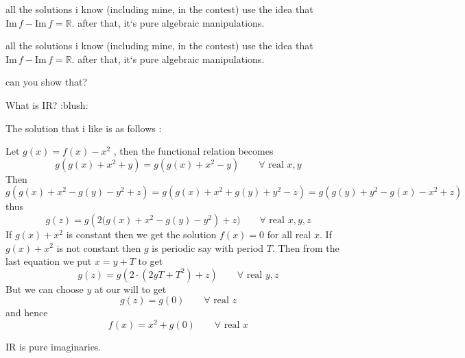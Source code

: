 \begin{mysolution}
	all the solutions i know (including mine, in the contest) use the idea that $\mbox{Im}\, f-\mbox{Im}\, f =\mathbb{R}$. after that, it`s pure algebraic manipulations.
\end{mysolution}



\begin{mysolution}
	\begin{tcolorbox}all the solutions i know (including mine, in the contest) use the idea that $\mbox{Im}\, f-\mbox{Im}\, f =\mathbb{R}$. after that, it`s pure algebraic manipulations.\end{tcolorbox}

can you show that?
\end{mysolution}



\begin{mysolution}
	What is IR?  :blush:
\end{mysolution}



\begin{mysolution}
	\begin{tcolorbox}The solution that i like is as follows :

Let $g(x)=f(x)-x^{2}$ , then the functional relation becomes \[g\left(g(x)+x^{2}+y\right)=g\left(g(x)+x^{2}-y\right)\qquad \forall \text{ real }x,y\]Then \[g\left(g(x)+x^{2}-g(y)-y^{2}+z\right)=g\left(g(x)+x^{2}+g(y)+y^{2}-z\right)=g\left(g(y)+y^{2}-g(x)-x^{2}+z\right)\] thus
\[g(z)=g\left(2(g(x)+x^{2}-g(y)-y^{2}\right)+z)\qquad \forall\text{ real }x,y,z\]If $g(x)+x^{2}$ is constant then we get the solution $f(x)=0$ for all real $x$. If $g(x)+x^{2}$ is not constant then $g$ is periodic say with period $T$. Then from the last equation we put $x=y+T$ to get \[g(z)=g\left(2\cdot(2yT+T^{2})+z\right)\qquad \forall \text{ real }y,z\]But we can choose $y$ at our will to get \[g(z)=g(0)\qquad\forall \text{ real }z\] and hence \[\boxed{f(x)=x^{2}+g(0) \qquad\forall \text{ real }x}\]\end{tcolorbox}

IR is pure imaginaries.
\end{mysolution}



